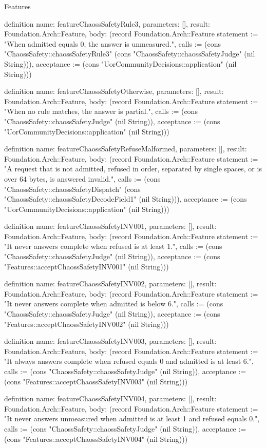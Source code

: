 \begin{lexlean}{Features}
\begin{semanticmodule}
definition{
  name: featureChaossSafetyRule3,
  parameters: [],
  result: Foundation.Arch::Feature,
  body: (record Foundation.Arch::Feature {statement := "When admitted equals 0, the answer is unmeasured.", calls := (cons "ChaossSafety::chaossSafetyRule3" (cons "ChaossSafety::chaossSafetyJudge" (nil String))), acceptance := (cons "UorCommunityDecisions::application" (nil String))})
}

definition{
  name: featureChaossSafetyOtherwise,
  parameters: [],
  result: Foundation.Arch::Feature,
  body: (record Foundation.Arch::Feature {statement := "When no rule matches, the answer is partial.", calls := (cons "ChaossSafety::chaossSafetyJudge" (nil String)), acceptance := (cons "UorCommunityDecisions::application" (nil String))})
}

definition{
  name: featureChaossSafetyRefuseMalformed,
  parameters: [],
  result: Foundation.Arch::Feature,
  body: (record Foundation.Arch::Feature {statement := "A request that is not admitted, refused in order, separated by single spaces, or is over 64 bytes, is answered invalid.", calls := (cons "ChaossSafety::chaossSafetyDispatch" (cons "ChaossSafety::chaossSafetyDecodeField1" (nil String))), acceptance := (cons "UorCommunityDecisions::application" (nil String))})
}

definition{
  name: featureChaossSafetyINV001,
  parameters: [],
  result: Foundation.Arch::Feature,
  body: (record Foundation.Arch::Feature {statement := "It never answers complete when refused is at least 1.", calls := (cons "ChaossSafety::chaossSafetyJudge" (nil String)), acceptance := (cons "Features::acceptChaossSafetyINV001" (nil String))})
}

definition{
  name: featureChaossSafetyINV002,
  parameters: [],
  result: Foundation.Arch::Feature,
  body: (record Foundation.Arch::Feature {statement := "It never answers complete when admitted is below 6.", calls := (cons "ChaossSafety::chaossSafetyJudge" (nil String)), acceptance := (cons "Features::acceptChaossSafetyINV002" (nil String))})
}

definition{
  name: featureChaossSafetyINV003,
  parameters: [],
  result: Foundation.Arch::Feature,
  body: (record Foundation.Arch::Feature {statement := "It always answers complete when refused equals 0 and admitted is at least 6.", calls := (cons "ChaossSafety::chaossSafetyJudge" (nil String)), acceptance := (cons "Features::acceptChaossSafetyINV003" (nil String))})
}

definition{
  name: featureChaossSafetyINV004,
  parameters: [],
  result: Foundation.Arch::Feature,
  body: (record Foundation.Arch::Feature {statement := "It never answers unmeasured when admitted is at least 1 and refused equals 0.", calls := (cons "ChaossSafety::chaossSafetyJudge" (nil String)), acceptance := (cons "Features::acceptChaossSafetyINV004" (nil String))})
}


\end{semanticmodule}
\end{lexlean}
